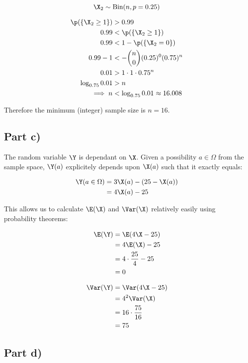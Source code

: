 \[
\X_2 \sim \mathrm{Bin}(n, p = 0.25)
\]

\begin{align}
\p(\{\X_2 \geq 1\}) &> 0.99 \\
0.99 &< \p(\{ \X_2 \geq 1 \}) \\
0.99 &< 1 - \p(\{ \X_2 = 0 \}) \\
0.99 - 1 &< - {n \choose 0}(0.25)^0(0.75)^n \\
0.01 &> 1 \cdot 1 \cdot 0.75^n \\
\log _{0.75} 0.01 &> n \\
\implies n &< \log _{0.75} 0.01 \approx 16.008
\end{align}

Therefore the minimum (integer) sample size is $n = 16$.

\subsection{Part c)}

The random variable $\Y$ is dependant on $\X$.
Given a possibility $a \in \Omega$ from the sample space, $\Y(a)$ explicitely depends upon $\X(a)$ such that it exactly equals:

\begin{align}
\Y(a \in \Omega) &= 3\X(a) - (25 - \X(a)) \\
&= 4\X(a) - 25
\end{align}

This allows us to calculate $\E(\X)$ and $\Var(\X)$ relatively easily using probability theorems:

\begin{align}
\E(\Y) &= \E(4\X - 25) \\
&= 4\E(\X) - 25 \\
&= 4 \cdot \frac{25}{4} - 25 \\
&= 0
\end{align}

\begin{align}
\Var(\Y) &= \Var(4\X - 25) \\
&= 4^2 \Var(\X) \\
&= 16 \cdot \frac{75}{16} \\
&= 75
\end{align}

\subsection{Part d)}

